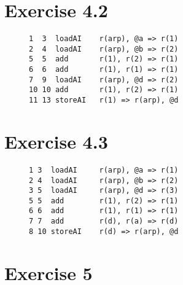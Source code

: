 \documentclass[11pt]{article} %
\begin{document}
\section*{Exercise 4.2}
\begin{figure}[H]
\begin{verbatim}
1  3  loadAI    r(arp), @a => r(1)
2  4  loadAI    r(arp), @b => r(2)
5  5  add       r(1), r(2) => r(1)
6  6  add       r(1), r(1) => r(1)
7  9  loadAI    r(arp), @d => r(2)
10 10 add       r(1), r(2) => r(1)
11 13 storeAI   r(1) => r(arp), @d 
\end{verbatim}
\end{figure}

\section*{Exercise 4.3}
\begin{figure}[H]
\begin{verbatim}
1 3  loadAI     r(arp), @a => r(1)
2 4  loadAI     r(arp), @b => r(2)
3 5  loadAI     r(arp), @d => r(3)
5 5  add        r(1), r(2) => r(1)
6 6  add        r(1), r(1) => r(1)
7 7  add        r(d), r(a) => r(d)
8 10 storeAI    r(d) => r(arp), @d 
\end{verbatim}
\end{figure}

\section*{Exercise 5}
\begin{figure}[H]
\end{figure}
\end{document}
